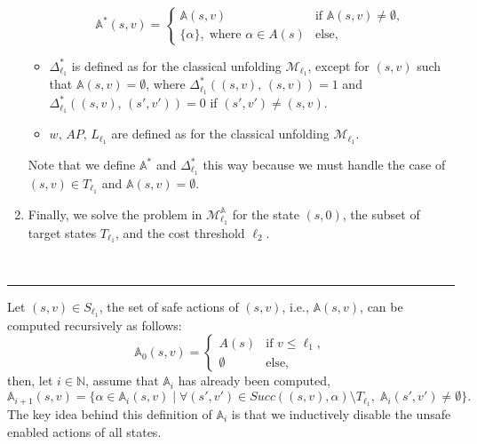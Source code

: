 \begin{center}
\begin{enumerate}
\begin{itemize}
    \[
      \mathbb{A}^*(s, v) = \begin{cases}
        \mathbb{A}(s, v) & \text{if } \mathbb{A}(s, v) \neq \emptyset, \, \\
        \{\alpha\}, \; \text{where } \alpha \in A(s) & \text{else},
      \end{cases}
    \]
    \item $\Delta^*_{\ell_1}$ is defined as for the classical unfolding $\mathcal{M}_{\ell_1}$, except for $(s, v)$ such that $\mathbb{A}(s, v) = \emptyset$, where $\Delta^*_{\ell_1}((s, v),\, (s, v)) = 1$ and $\Delta^*_{\ell_1}((s, v), \, (s', v')) = 0$ if $(s', v') \neq (s, v)$.
    \item $w, \, AP, \, L_{\ell_1}$ are defined as for the classical unfolding $\mathcal{M}_{\ell_1}$.
  \end{itemize}
  Note that we define $\mathbb{A}^*$ and $\Delta_{\ell_1}^*$ this way because we must handle the case of $(s, v) \in T_{\ell_1}$ and $\mathbb{A}(s, v) = \emptyset$.
  \item Finally, we solve the \SSPE{} problem in $\mathcal{M}^\mathbb{A}_{\ell_1}$ for the state $(s, 0)$, the subset of target states $T_{\ell_1}$, and the cost threshold $\ell_2$.
\end{enumerate}
$ $\\
\kern2pt\hrule\relax%
\end{center}
\par
Let $(s, v) \in S_{\ell_1}$, the set of safe actions of $(s, v)$, i.e., $\mathbb{A}(s, v)$, can be computed recursively
as follows:
\[
  \mathbb{A}_0(s, v) = \begin{cases}
    A(s) & \text{if }v \leq \ell_1,\\
    \emptyset & \text{else},
  \end{cases}
\]
then, let $i \in \mathbb{N}$, assume that $\mathbb{A}_i$ has already been computed,
\[
  \mathbb{A}_{i+1}(s, v) = \{ \alpha \in \mathbb{A}_i(s, v) \; | \;
    \forall (s', v') \in Succ( (s, v), \alpha ) \setminus T_{\ell_1}, \; \mathbb{A}_i(s', v') \neq \emptyset \}.
\]
The key idea behind this definition of $\mathbb{A}_i$ is that we inductively disable the unsafe enabled actions of all states.
